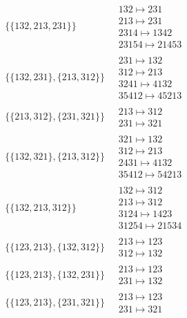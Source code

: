 \begin{scriptsize}
\begin{align}
\begin{matrix}
\end{matrix}
\\
\{\{132, 213, 231\}\}
\ 
&
\begin{matrix}
132 \mapsto 231\\213 \mapsto 231\\2314 \mapsto 1342\\23154 \mapsto 21453
\end{matrix}
\\
\{\{132, 231\}, \{213, 312\}\}
\ 
&
\begin{matrix}
231 \mapsto 132\\312 \mapsto 213\\3241 \mapsto 4132\\35412 \mapsto 45213
\end{matrix}
\\
\{\{213, 312\}, \{231, 321\}\}
\ 
&
\begin{matrix}
213 \mapsto 312\\231 \mapsto 321
\end{matrix}
\\
\{\{132, 321\}, \{213, 312\}\}
\ 
&
\begin{matrix}
321 \mapsto 132\\312 \mapsto 213\\2431 \mapsto 4132\\35412 \mapsto 54213
\end{matrix}
\\
\{\{132, 213, 312\}\}
\ 
&
\begin{matrix}
132 \mapsto 312\\213 \mapsto 312\\3124 \mapsto 1423\\31254 \mapsto 21534
\end{matrix}
\\
\{\{123, 213\}, \{132, 312\}\}
\ 
&
\begin{matrix}
213 \mapsto 123\\312 \mapsto 132
\end{matrix}
\\
\{\{123, 213\}, \{132, 231\}\}
\ 
&
\begin{matrix}
213 \mapsto 123\\231 \mapsto 132
\end{matrix}
\\
\{\{123, 213\}, \{231, 321\}\}
\ 
&
\begin{matrix}
213 \mapsto 123\\231 \mapsto 321
\end{matrix}
\\

\end{align}
\end{scriptsize}
